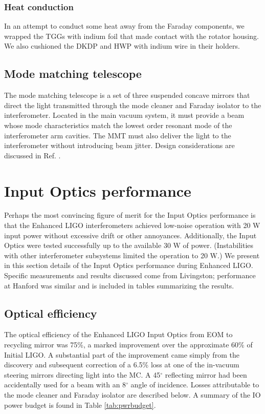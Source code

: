 \subsubsection{Heat conduction}
In an attempt to conduct some heat away from the Faraday components,
we wrapped the TGGs with indium foil that made contact with the
rotator housing. We also cushioned the DKDP and HWP with indium wire
in their holders.

\subsection{Mode matching telescope}
The mode matching telescope is a set of three suspended concave
mirrors that direct the light transmitted through the mode cleaner and
Faraday isolator to the interferometer. Located in the main vacuum
system, it must provide a beam whose mode characteristics match the
lowest order resonant mode of the interferometer arm cavities. The MMT
must also deliver the light to the interferometer without introducing
beam jitter.  Design considerations are discussed in
Ref. \cite{Delker1997Design}.



\section{Input Optics performance}
\label{sec:performance}
Perhaps the most convincing figure of merit for the Input Optics
performance is that the Enhanced LIGO interferometers achieved
low-noise operation with 20 W input power without excessive drift or
other annoyances. Additionally, the Input Optics were tested
successfully up to the available 30 W of power.  (Instabilities with
other interferometer subsystems limited the operation to 20 W.) We
present in this section details of the Input Optics performance during
Enhanced LIGO. Specific measurements and results discussed come from
Livingston; performance at Hanford was similar and is included in
tables summarizing the results.

\subsection{Optical efficiency}
The optical efficiency of the Enhanced LIGO Input Optics from EOM to
recycling mirror was 75\%, a marked improvement over the approximate
60\% of Initial LIGO. A substantial part of the improvement came
simply from the discovery and subsequent correction of a 6.5\% loss at
one of the in-vacuum steering mirrors directing light into the MC. A
45$^\circ$ reflecting mirror had been accidentally used for a beam
with an 8$^\circ$ angle of incidence. Losses attributable to the mode
cleaner and Faraday isolator are described below. A summary of the IO
power budget is found in Table \ref{tab:pwrbudget}.

